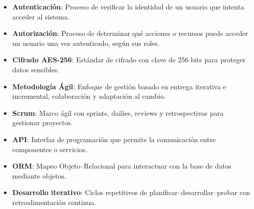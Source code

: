 \begin{itemize}
    \item \textbf{Autenticación}: Proceso de verificar la identidad de un usuario que intenta acceder al sistema.
    \item \textbf{Autorización}: Proceso de determinar qué acciones o recursos puede acceder un usuario una vez autenticado, según sus roles.
    \item \textbf{Cifrado AES-256}: Estándar de cifrado con clave de 256 bits para proteger datos sensibles.
    \item \textbf{Metodología Ágil}: Enfoque de gestión basado en entrega iterativa e incremental, colaboración y adaptación al cambio.
    \item \textbf{Scrum}: Marco ágil con sprints, dailies, reviews y retrospectivas para gestionar proyectos.
    \item \textbf{API}: Interfaz de programación que permite la comunicación entre componentes o servicios.
    \item \textbf{ORM}: Mapeo Objeto–Relacional para interactuar con la base de datos mediante objetos.
    \item \textbf{Desarrollo iterativo}: Ciclos repetitivos de planificar–desarrollar–probar con retroalimentación continua.
\end{itemize}


